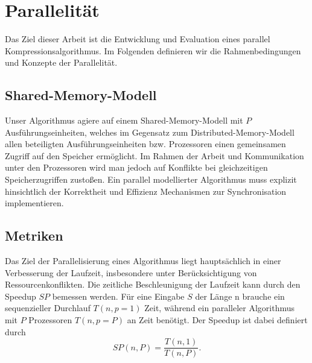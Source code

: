 \section{Parallelität}
Das Ziel dieser Arbeit ist die Entwicklung und Evaluation eines parallel Kompressionsalgorithmus. Im Folgenden definieren wir die Rahmenbedingungen und Konzepte der Parallelität.

\subsection{Shared-Memory-Modell}
Unser Algorithmus agiere auf einem Shared-Memory-Modell mit $P$ Ausführungseinheiten, welches im Gegensatz zum Distributed-Memory-Modell allen beteiligten Ausführungseinheiten bzw. 
Prozessoren einen gemeinsamen Zugriff auf den Speicher ermöglicht. Im Rahmen der Arbeit und Kommunikation unter den Prozessoren wird man jedoch auf Konflikte bei gleichzeitigen 
Speicherzugriffen zustoßen. Ein parallel modellierter Algorithmus muss explizit hinsichtlich der Korrektheit und Effizienz Mechanismen zur Synchronisation implementieren.

\subsection{Metriken}
Das Ziel der Parallelisierung eines Algorithmus liegt hauptsächlich in einer Verbesserung der Laufzeit, insbesondere unter Berücksichtigung von Ressourcenkonflikten. Die zeitliche
Beschleunigung der Laufzeit kann durch den Speedup $SP$ bemessen werden. Für eine Eingabe $S$ der Länge n brauche ein sequenzieller Durchlauf $T(n, p=1)$ Zeit, während ein paralleler
Algorithmus mit $P$ Prozessoren $T(n,p=P)$ an Zeit benötigt. Der Speedup ist dabei definiert durch
\begin{equation}
    SP(n,P) = \frac{T(n,1)}{T(n,P)}.
\end{equation}

